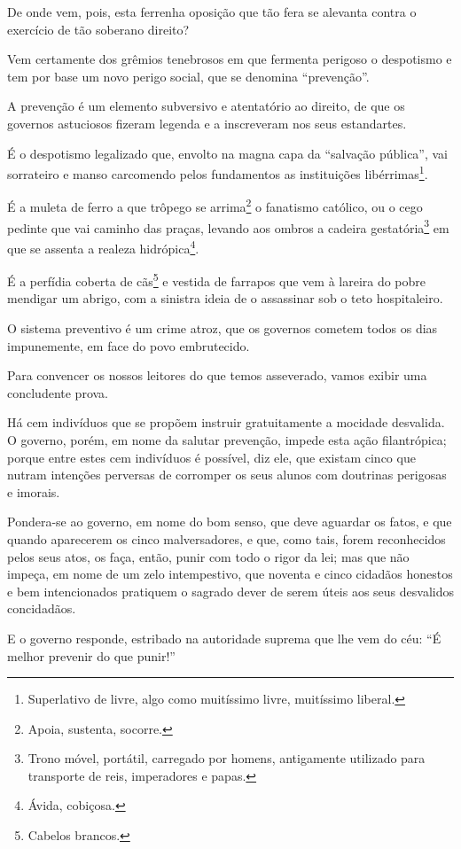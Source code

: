 De onde vem, pois, esta ferrenha oposição que tão fera se alevanta
contra o exercício de tão soberano direito?

Vem certamente dos grêmios tenebrosos em que fermenta perigoso o
despotismo e tem por base um novo perigo social, que se denomina
``prevenção''.

A prevenção é um elemento subversivo e atentatório ao direito, de que os
governos astuciosos fizeram legenda e a inscreveram nos seus
estandartes.

É o despotismo legalizado que, envolto na magna capa da ``salvação
pública'', vai sorrateiro e manso carcomendo pelos fundamentos as
instituições libérrimas\footnote{Superlativo de livre, algo como
  muitíssimo livre, muitíssimo liberal.}.

É a muleta de ferro a que trôpego se arrima\footnote{Apoia, sustenta,
  socorre.} o fanatismo católico, ou o cego pedinte que vai caminho das
praças, levando aos ombros a cadeira gestatória\footnote{Trono móvel,
  portátil, carregado por homens, antigamente utilizado para transporte
  de reis, imperadores e papas.} em que se assenta a realeza
hidrópica\footnote{Ávida, cobiçosa.}.

É a perfídia coberta de cãs\footnote{Cabelos brancos.} e vestida de
farrapos que vem à lareira do pobre mendigar um abrigo, com a sinistra
ideia de o assassinar sob o teto hospitaleiro.

O sistema preventivo é um crime atroz, que os governos cometem todos os
dias impunemente, em face do povo embrutecido.

Para convencer os nossos leitores do que temos asseverado, vamos exibir
uma concludente prova.

Há cem indivíduos que se propõem instruir gratuitamente a mocidade
desvalida. O governo, porém, em nome da salutar prevenção, impede esta
ação filantrópica; porque entre estes cem indivíduos é possível, diz
ele, que existam cinco que nutram intenções perversas de corromper os
seus alunos com doutrinas perigosas e imorais.

Pondera-se ao governo, em nome do bom senso, que deve aguardar os fatos,
e que quando aparecerem os cinco malversadores, e que, como tais, forem
reconhecidos pelos seus atos, os faça, então, punir com todo o rigor da
lei; mas que não impeça, em nome de um zelo intempestivo, que noventa e
cinco cidadãos honestos e bem intencionados pratiquem o sagrado dever de
serem úteis aos seus desvalidos concidadãos.

E o governo responde, estribado na autoridade suprema que lhe vem do
céu: ``É melhor prevenir do que punir!''

